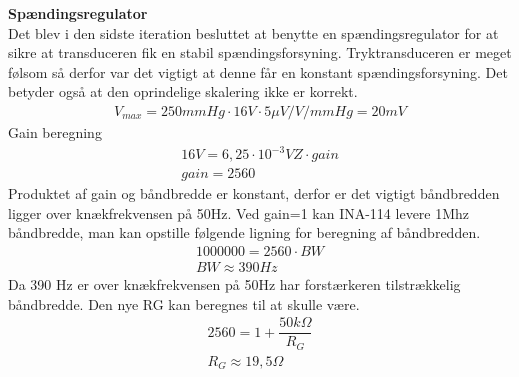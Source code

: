 \textbf{Spændingsregulator}\\
Det blev i den sidste iteration besluttet at benytte en spændingsregulator for at sikre at transduceren fik en stabil spændingsforsyning. Tryktransduceren er meget følsom så derfor var det vigtigt at denne får en konstant spændingsforsyning. Det betyder også at den oprindelige skalering ikke er korrekt.
\begin{align*}
V_{max}=250mmHg\cdot 16V\cdot5\mu V/V/mmHg =20 mV
\end{align*}
Gain beregning
\begin{align*}
16V = 6,25\cdot 10^{-3}VZ\cdot gain\\
gain=2560
\end{align*}
Produktet af gain og båndbredde er konstant, derfor er det vigtigt båndbredden ligger over knækfrekvensen på 50Hz. Ved gain=1 kan INA-114 levere 1Mhz båndbredde, man kan opstille følgende ligning for beregning af båndbredden.
\begin{align*}
1000000=2560\cdot BW\\
BW\approx 390Hz
\end{align*}
Da 390 Hz er over knækfrekvensen på 50Hz har forstærkeren tilstrækkelig båndbredde. Den nye RG kan beregnes til at skulle være.
\begin{align*}
2560=1+\dfrac{50k\Omega}{R_G}\\
R_G\approx 19,5\Omega
\end{align*}
